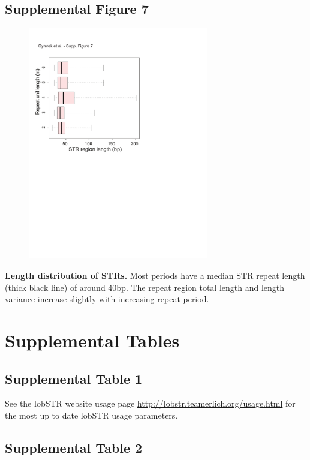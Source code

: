 \subsection{Supplemental Figure 7}
\begin{figure}[h!]
\centering
\label{fig:lobsup7}
\includegraphics[width=0.7\textwidth]{Figures/Chapter2/SuppFig7.pdf}
\end{figure}
\textbf{Length distribution of STRs.} Most periods have a median STR repeat length (thick black line) of around 40bp. The repeat region total length and length variance increase slightly with increasing repeat period.

\section{Supplemental Tables}

\subsection{Supplemental Table 1}
\label{tab:lobsuptab1}
See the lobSTR website usage page \url{http://lobstr.teamerlich.org/usage.html} for the most up to date lobSTR usage parameters.

\pagebreak

\subsection{Supplemental Table 2}

